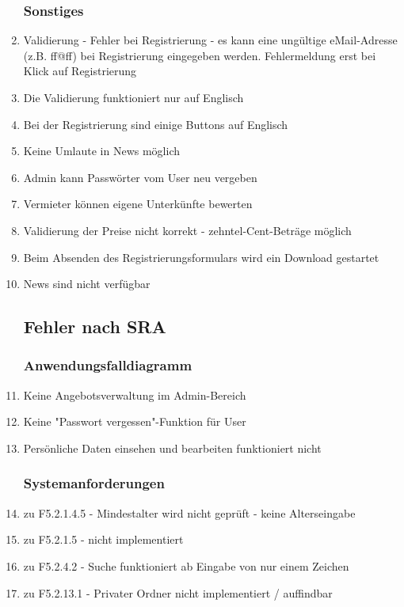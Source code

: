 \documentclass[10pt,a4paper]{scrartcl}
\begin{document}
\begin{enumerate}
\subsubsection{Sonstiges}
\item Validierung - Fehler bei Registrierung - es kann eine ungültige eMail-Adresse (z.B. ff@ff) bei Registrierung eingegeben werden. Fehlermeldung erst bei Klick auf Registrierung
\item Die Validierung funktioniert nur auf Englisch
\item Bei der Registrierung sind einige Buttons auf Englisch
\item Keine Umlaute in News möglich
\item Admin kann Passwörter vom User neu vergeben
\item Vermieter können eigene Unterkünfte bewerten
\item Validierung der Preise nicht korrekt - zehntel-Cent-Beträge möglich
\item Beim Absenden des Registrierungsformulars wird ein Download gestartet
\item News sind nicht verfügbar

\subsection{Fehler nach SRA}

\subsubsection{Anwendungsfalldiagramm}
\item Keine Angebotsverwaltung im Admin-Bereich
\item Keine "Passwort vergessen"-Funktion für User
\item Persönliche Daten einsehen und bearbeiten funktioniert nicht

\subsubsection{Systemanforderungen}
\item zu F5.2.1.4.5 - Mindestalter wird nicht geprüft - keine Alterseingabe
\item zu F5.2.1.5 - nicht implementiert
\item zu F5.2.4.2 - Suche funktioniert ab Eingabe von nur einem Zeichen
\item zu F5.2.13.1 - Privater Ordner nicht implementiert / auffindbar


\end{enumerate}
\end{document}
